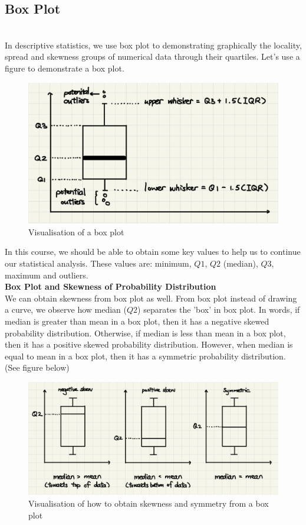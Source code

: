\subsection{Box Plot}\\

\noindent
In descriptive statistics, we use box plot to demonstrating graphically the locality, spread and skewness groups of numerical data through their quartiles. Let's use a figure to demonstrate a box plot. 

\begin{figure}[H]
 \centering
 \includegraphics[scale=0.30]{Section1/img/Boxplot.jpg}
 \caption{Visualisation of a box plot}
\end{figure}

In this course, we should be able to obtain some key values to help us to continue our statistical analysis. These values are: minimum, $Q1$, $Q2$ (median), $Q3$, maximum and outliers.\\

\noindent
\textbf{Box Plot and Skewness of Probability Distribution}\\

\noindent
We can obtain skewness from box plot as well. From box plot instead of drawing a curve, we observe how median ($Q2$) separates the 'box' in box plot. In words, if median is greater than mean in a box plot, then it has a negative skewed probability distribution. Otherwise, if median is less than mean in a box plot, then it has a positive skewed probability distribution. However, when median is equal to mean in a box plot, then it has a symmetric probability distribution. (See figure below)

\begin{figure}[H]
 \centering
 \includegraphics[scale=0.20]{Section1/img/BoxSk.jpg}
 \caption{Visualisation of how to obtain skewness and symmetry from a box plot}
\end{figure}

